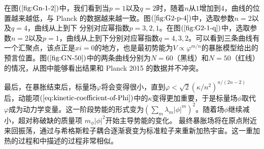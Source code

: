 在图$(\ref{fig:Gn-1-2})$中，我们看到当$p=1$以及$q=2$时，随着$n$从$1$增加到$4$，曲线的位置越来越低，与
Planck
的数据越来越一致。图$(\ref{fig:G2-p-4})$中，选取参数$n=2$以及$q=4$，曲线从上到下
分别对应幂指数$p=3,2,1$。在图$(\ref{fig:G2-1-q})$中，选取参数$n=2$以及$p=1$，曲线从上到下分别对应幂指数$q=4,3,2$。可以看到三条曲线有一个汇聚点，该点正是$xi=0$的地方，也是最初势能为$V\propto
\varphi^{m
/n}$的暴胀模型给出的预言位置。图$(\ref{fig:GN-50})$中的两条曲线分别为$N=60$（黑线）和$N=50$（红线）的情况，从图中能够看出结果和
Planck 2015 的数据并不冲突。

最后，在暴胀结束后，标量场$\varphi$将会变得很小，直到$\varphi <
\sqrt{2}{\left(\kappa /n^2\right)}^{n
/(2n-2)}$后，动能项$(\ref{eq:kinetic-coefficient-of-Phi})$中的$\kappa$变得更加重要，于是标量场$\phi$取代$\varphi$成为动力学变量。这一阶段势能的形式变为${\left(\sum_m
\lambda_m \left\lvert
\phi\right\rvert^{m}\right)}^2$。随着场$\phi$继续减小，超对称破缺的质量项
$m_{\phi}\left\lvert\phi\right\rvert^2$开始主导势能的变化。
最终暴胀场将在原点附近来回振荡，通过与希格斯粒子耦合逐渐衰变为标准粒子来重新加热宇宙。这一重加热的过程和\citep{nakayama2010running}中描述的过程非常相似。
